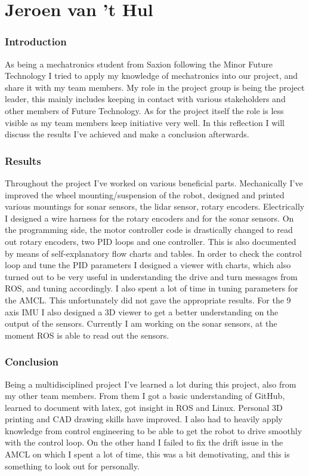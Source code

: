\section{Jeroen van 't Hul}
\subsubsection{Introduction}
As being a mechatronics student from Saxion following the Minor Future Technology I tried to apply my knowledge of mechatronics into our project, and share it with my team members. 
My role in the project group is being the project leader, this mainly includes keeping in contact with various stakeholders and other members of Future Technology. 
As for the project itself the role is less visible as my team members keep initiative very well. 
In this reflection I will discuss the results I've achieved and make a conclusion afterwards.


\subsubsection{Results}
Throughout the project I've worked on various beneficial parts. 
Mechanically I've improved the wheel mounting/suspension of the robot, designed and printed various mountings for sonar sensors, the lidar sensor, rotary encoders. 
Electrically I designed a wire harness for the rotary encoders and for the sonar sensors. On the programming side, the motor controller code is drastically changed to read out rotary encoders, two PID loops and one controller. This is also documented by means of self-explanatory flow charts and tables. 
In order to check the control loop and tune the PID parameters I designed a viewer with charts, which also turned out to be very useful in understanding the drive and turn messages from ROS, and tuning accordingly.
I also spent a lot of time in tuning parameters for the AMCL. This unfortunately did not gave the appropriate results. 
For the 9 axis IMU I also designed a 3D viewer to get a better understanding on the output of the sensors.
Currently I am working on the sonar sensors, at the moment ROS is able to read out the sensors.

\subsubsection{Conclusion}
Being a multidisciplined project I've learned a lot during this project, also from my other team members.
From them I got a basic understanding of GitHub, learned to document with latex, got insight in ROS and Linux. 
Personal 3D printing and CAD drawing skills have improved. 
I also had to heavily apply knowledge from control engineering to be able to get the robot to drive smoothly with the control loop.
On the other hand I failed to fix the drift issue in the AMCL on which I spent a lot of time, this was a bit demotivating, and this is something to look out for personally. 
